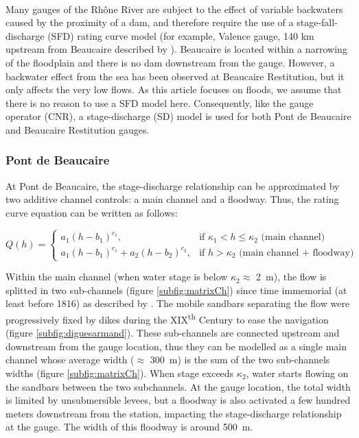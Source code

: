 	\paragraph{} Many gauges of the Rhône River are subject to the effect of variable backwaters caused by the proximity of a dam, and therefore require the use of a stage-fall-discharge (SFD) rating curve model (for example, Valence gauge, 140 km upstream from Beaucaire described by \cite{mansanarez_non-unique_2016}). Beaucaire is located within a narrowing of the floodplain and there is no dam downstream from the gauge. However, a backwater effect from the sea has been observed at Beaucaire Restitution, but it only affects the very low flows. As this article focuses on floods, we assume that there is no reason to use a SFD model here. Consequently, like the gauge operator (CNR), a stage-discharge (SD) model is used for both Pont de Beaucaire and Beaucaire Restitution gauges.
                
        \subsubsection{Pont de Beaucaire}
        
         At Pont de Beaucaire, the stage-discharge relationship can be approximated by two additive channel controls: a main channel and a floodway. Thus, the rating curve equation can be written as follows: 

        \begin{equation}
        Q(h) =
          \begin{cases}
           a_1(h-b_1)^{c_1}, & \text{if $\kappa_1 < h \leq \kappa_2$ (main channel) }\\
           a_1(h-b_1)^{c_1}+ a_2(h-b_2)^{c_2}, & \text{if $h > \kappa_2$ (main channel + floodway)}
          \end{cases}
          \label{eq:RcPt}
        \end{equation}

    Within the main channel (when water stage is below $\kappa_2 \approx$ 2~m), the flow is splitted in two sub-channels (figure \ref{subfig:matrixCh}) since time immemorial (at least before 1816) as described by \citet{armand_ii_1907}. The mobile sandbars separating the flow were progressively fixed by dikes during the XIX\textsuperscript{th} Century to ease the navigation (figure \ref{subfig:diguesarmand}). These sub-channels are connected upstream and downstream from the gauge location, thus they can be modelled as a single main channel whose average width ($\approx$ 300~m) is the sum of the two sub-channels widths (figure \ref{subfig:matrixCh}). When stage exceeds $\kappa_2$, water starts flowing on the sandbars between the two subchannels. At the gauge location, the total width is limited by unsubmersible levees, but a floodway is also activated a few hundred meters downstream from the station, impacting the stage-discharge relationship at the gauge. The width of this floodway is around 500~m.   

